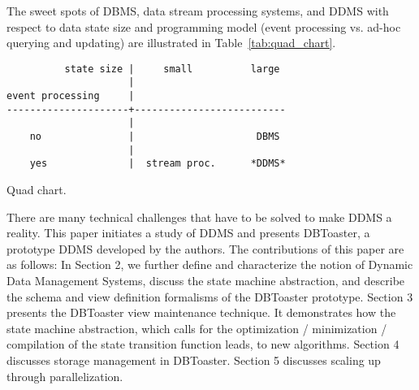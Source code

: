 The sweet spots of DBMS, data stream processing systems, and DDMS with
respect to data state size and programming model (event processing vs. ad-hoc querying and updating) are illustrated in Table~\ref{tab:quad_chart}.


\begin{table}
\begin{verbatim}
          state size |     small          large
                     |
event processing     |
---------------------+--------------------------
                     |
    no               |                     DBMS
                     |
    yes              |  stream proc.      *DDMS*
\end{verbatim}
\caption{Quad chart.}
\label{tab:quad_chart}
\end{table}


There are many technical challenges that have to be solved to make DDMS a reality. This paper initiates a study of DDMS and presents DBToaster, a prototype DDMS developed by the authors. The contributions of this paper are as follows:
In Section 2, we further define and characterize the notion of Dynamic Data Management Systems, discuss the state machine abstraction, and describe the schema and view definition formalisms of the DBToaster prototype.
Section 3 presents the DBToaster view maintenance technique. It demonstrates how the state machine abstraction, which calls for the optimization / minimization / compilation of the state transition function leads, to new algorithms.
Section 4 discusses storage management in DBToaster.
Section 5 discusses scaling up through parallelization.

